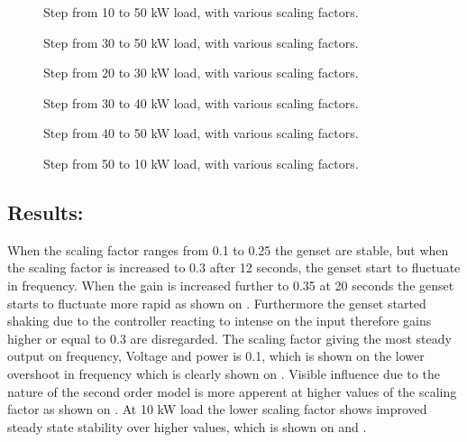 \begin{figure}[H]
\centering

\caption{Step from 10 to 50 kW load, with various scaling factors.}
\label{fig:test11-14-10to50kwstepvolt}
\end{figure}

\begin{figure}[H]
\centering

\caption{Step from 30 to 50 kW load, with various scaling factors.}
\label{fig:test11-14-30to50kwstepvolt}
\end{figure}

\begin{figure}[H]
\centering

\caption{Step from 20 to 30 kW load, with various scaling factors.}
\label{fig:test11-14-20to30kwstepvolt}
\end{figure}

\begin{figure}[H]
\centering

\caption{Step from 30 to 40 kW load, with various scaling factors.}
\label{fig:test11-14-30to40kwstepvolt}
\end{figure}

\begin{figure}[H]
\centering

\caption{Step from 40 to 50 kW load, with various scaling factors.}
\label{fig:test11-14-40to50kwstepvolt}
\end{figure}

\begin{figure}[H]
\centering

\caption{Step from 50 to 10 kW load, with various scaling factors.}
\label{fig:test11-14-50to10kwstepvolt}
\end{figure}


\subsection*{Results:}

When the scaling factor ranges from 0.1 to 0.25 the genset are stable, but when the scaling factor is increased to 0.3 after 12 seconds, the genset start to fluctuate in frequency. When the gain is increased further to 0.35 at 20 seconds the genset starts to fluctuate more rapid as shown on . Furthermore the genset started shaking due to the controller reacting to intense on the input therefore gains higher or equal to 0.3 are disregarded. The scaling factor giving the most steady output on frequency, Voltage and power is 0.1, which is shown on the lower overshoot in frequency which is clearly shown on . Visible influence due to the nature of the second order model is more apperent at higher values of the scaling factor as shown on . At 10 kW load the lower scaling factor shows improved steady state stability over higher values, which is shown on  and .

